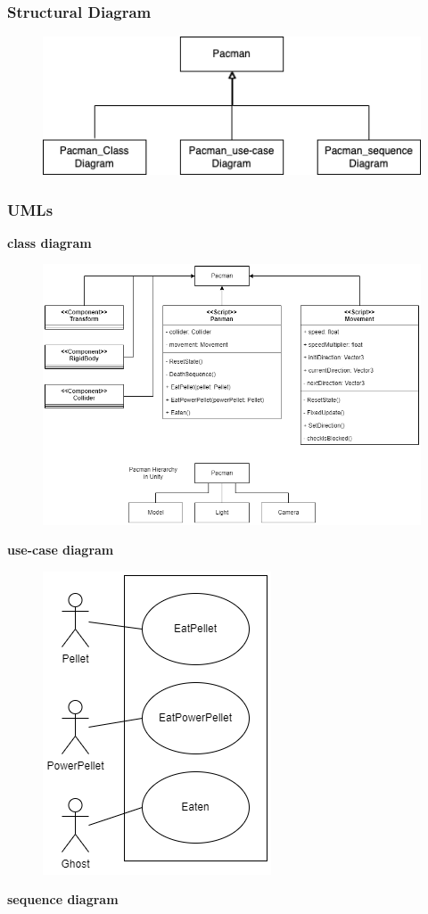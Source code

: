 \documentclass[11pt]{article}
\begin{document}
\subsubsection{Structural Diagram}
\begin{figure}[H]
    \centering
    \includegraphics*[scale=0.4]{Pacman_struct.png}
\end{figure}
\subsubsection{UMLs}
\textbf{class diagram}\\
\begin{figure}[H]
    \centering
    \includegraphics*[scale=0.4]{Pacman_Class.png}
\end{figure}
\textbf{use-case diagram}\\
\begin{figure}[H]
    \centering
    \includegraphics*[scale=0.4]{Pacman_use-case.png}
\end{figure}
\textbf{sequence diagram}
\end{document}
